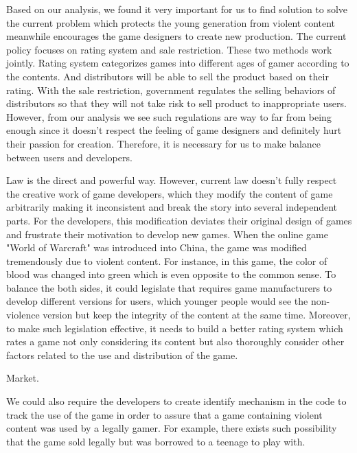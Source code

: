 \indent\indent Based on our analysis, we found it very important for us to find solution to solve the current problem which protects the young generation from violent content meanwhile encourages the game designers to create new production. The current policy focuses on rating system and sale restriction. These two methods work jointly. Rating system categorizes games into different ages of gamer according to the contents. And distributors will be able to sell the product based on their rating. With the sale restriction, government regulates the selling behaviors of distributors so that they will not take risk to sell product to inappropriate users. However, from our analysis we see such regulations are way to far from being enough since it doesn't respect the feeling of game designers and definitely hurt their passion for creation. Therefore, it is necessary for us to make balance between users and developers. 

Law is the direct and powerful way. However, current law doesn't fully respect the creative work of game developers, which they modify the content of game arbitrarily making it inconsistent and break the story into several independent parts. For the developers, this modification deviates their original design of games and frustrate their motivation to develop new games. When the online game "World of Warcraft" was introduced into China, the game was modified tremendously due to violent content. For instance, in this game, the color of blood was changed into green which is even opposite to the common sense. To balance the both sides, it could legislate that requires game manufacturers to develop different versions for users, which younger people would see the non-violence version but keep the integrity of the content at the same time. Moreover, to make such legislation effective, it needs to build a better rating system which rates a game not only considering its content but also thoroughly consider other factors related to the use and distribution of the game. 

Market. 

We could also require the developers to create identify mechanism in the code to track the use of the game in order to assure that a game containing violent content was used by a legally gamer.
For example, there exists such possibility that the game sold legally but was borrowed to a teenage to play with. 


